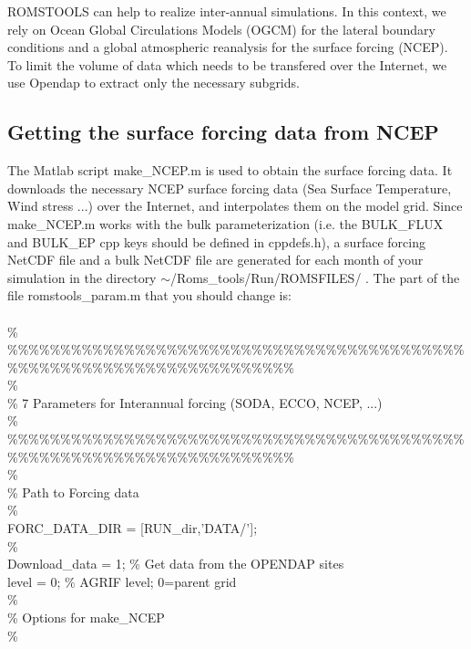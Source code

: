 ROMSTOOLS can help to realize inter-annual simulations. In this context, 
we rely on Ocean Global Circulations Models (OGCM) for the lateral 
boundary conditions and a global atmospheric reanalysis for the surface 
forcing (NCEP). To limit the volume of data which needs to be transfered 
over the Internet, we use Opendap to extract only the necessary subgrids. 

\subsection{Getting the surface forcing data from NCEP}

The Matlab script make\_NCEP.m is used to obtain the surface forcing data.
It downloads the necessary NCEP surface forcing data (Sea Surface 
Temperature, Wind stress ...) over the Internet, and interpolates them on 
the model grid. Since make\_NCEP.m works with the bulk parameterization 
(i.e. the 
BULK\_FLUX and BULK\_EP cpp keys should be defined in cppdefs.h),
a surface forcing NetCDF file and a bulk NetCDF file are generated for 
each month of your simulation in the directory 
$\sim$/Roms\_tools/Run/ROMSFILES/ .
The part of the file romstools\_param.m that you should change is:\\\\
\%\\
\%\%\%\%\%\%\%\%\%\%\%\%\%\%\%\%\%\%\%\%\%\%\%\%\%\%\%\%\%\%\%\%\%\%\%\%\%\%\%\%\%\%\%\%\%\%\%\%\%\%\%\%\%\%\%\%\%\%\%\%\%\%\%\%\%\%\%\%\%\%\\
\%\\
\% 7 Parameters for Interannual forcing (SODA, ECCO, NCEP, ...)\\
\%\\
\%\%\%\%\%\%\%\%\%\%\%\%\%\%\%\%\%\%\%\%\%\%\%\%\%\%\%\%\%\%\%\%\%\%\%\%\%\%\%\%\%\%\%\%\%\%\%\%\%\%\%\%\%\%\%\%\%\%\%\%\%\%\%\%\%\%\%\%\%\%\\
\%\\
\% Path to Forcing data\\
\%\\
FORC\_DATA\_DIR = [RUN\_dir,'DATA/'];\\
\%\\
Download\_data = 1;                            \% Get data from the OPENDAP sites \\
level         = 0;                            \% AGRIF level; 0=parent grid \\
\%\\
\%  Options for make\_NCEP\\
\%\\
